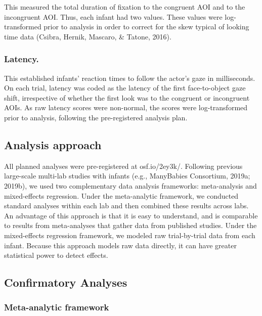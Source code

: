\documentclass[,man,floatsintext]{apa6}
\begin{document}
This measured the total duration of fixation to the congruent AOI and to the incongruent AOI. Thus, each infant had two values. These values were log-transformed prior to analysis in order to correct for the skew typical of looking time data (Csibra, Hernik, Mascaro, \& Tatone, 2016).

\hypertarget{latency.}{%
\subsubsection{Latency.}\label{latency.}}

This established infants' reaction times to follow the actor's gaze in milliseconds. On each trial, latency was coded as the latency of the first face-to-object gaze shift, irrespective of whether the first look was to the congruent or incongruent AOIs. As raw latency scores were non-normal, the scores were log-transformed prior to analysis, following the pre-registered analysis plan.

\hypertarget{analysis-approach}{%
\subsection{Analysis approach}\label{analysis-approach}}

All planned analyses were pre-registered at osf.io/2ey3k/. Following previous large-scale multi-lab studies with infants (e.g., ManyBabies Consortium, 2019a; 2019b), we used two complementary data analysis frameworks: meta-analysis and mixed-effects regression. Under the meta-analytic framework, we conducted standard analyses within each lab and then combined these results across labs. An advantage of this approach is that it is easy to understand, and is comparable to results from meta-analyses that gather data from published studies. Under the mixed-effects regression framework, we modeled raw trial-by-trial data from each infant. Because this approach models raw data directly, it can have greater statistical power to detect effects.

\hypertarget{confirmatory-analyses}{%
\subsection{Confirmatory Analyses}\label{confirmatory-analyses}}

\hypertarget{meta-analytic-framework}{%
\subsubsection{Meta-analytic framework}\label{meta-analytic-framework}}
\end{document}
